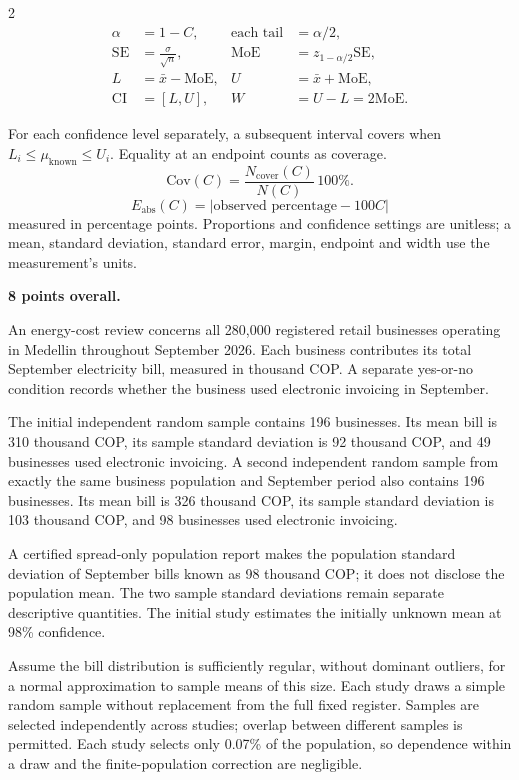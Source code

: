 \begin{multicols}{2}
\[
\begin{aligned}
\alpha&=1-C, &\text{each tail}&=\alpha/2,\\
\mathrm{SE}&=\frac{\sigma}{\sqrt n}, &\mathrm{MoE}&=z_{1-\alpha/2}\mathrm{SE},\\
L&=\bar x-\mathrm{MoE}, &U&=\bar x+\mathrm{MoE},\\
\mathrm{CI}&=[L,U], &W&=U-L=2\mathrm{MoE}.
\end{aligned}
\]

For each confidence level separately, a subsequent interval covers when
$L_i\leq\mu_{\mathrm{known}}\leq U_i$. Equality at an endpoint counts as coverage.
\[
\mathrm{Cov}(C)=\frac{N_{\mathrm{cover}}(C)}{N(C)}\,100\%.
\]
\[
E_{\mathrm{abs}}(C)=|\text{observed percentage}-100C|
\]
measured in percentage points.
Proportions and confidence settings are unitless; a mean, standard deviation, standard error, margin, endpoint and width use the measurement's units.

\endgroup

\columnbreak
\begingroup\small
{}
\textbf{8 points overall.}

An energy-cost review concerns all 280,000 registered retail businesses operating in Medellin throughout September 2026. Each business contributes its total September electricity bill, measured in thousand COP. A separate yes-or-no condition records whether the business used electronic invoicing in September.

The initial independent random sample contains 196 businesses. Its mean bill is 310 thousand COP, its sample standard deviation is 92 thousand COP, and 49 businesses used electronic invoicing. A second independent random sample from exactly the same business population and September period also contains 196 businesses. Its mean bill is 326 thousand COP, its sample standard deviation is 103 thousand COP, and 98 businesses used electronic invoicing.

A certified spread-only population report makes the population standard deviation of September bills known as 98 thousand COP; it does not disclose the population mean. The two sample standard deviations remain separate descriptive quantities. The initial study estimates the initially unknown mean at 98\% confidence.

Assume the bill distribution is sufficiently regular, without dominant outliers, for a normal approximation to sample means of this size. Each study draws a simple random sample without replacement from the full fixed register. Samples are selected independently across studies; overlap between different samples is permitted. Each study selects only 0.07\% of the population, so dependence within a draw and the finite-population correction are negligible.


\end{multicols}
